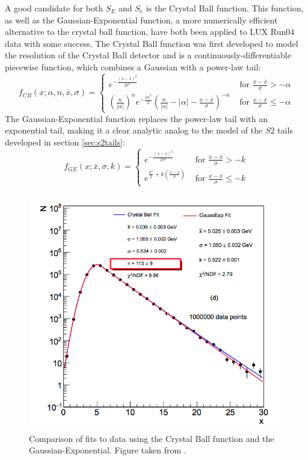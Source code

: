 A good candidate for both $S_E$ and $S_e$ is the Crystal Ball function\cite{crystalball}. This function, as well as the Gaussian-Exponential function, a more numerically efficient alternative to the crystal ball function\cite{alternatecrystalball}, have both been applied to LUX Run04 data with some success. The Crystal Ball function was first developed to model the resolution of the Crystal Ball detector and is a continuously-differentiable piecewise function, which combines a Gaussian with a power-law tail:
\begin{equation}\label{eq:crystalball}
f_{CB}(x;\alpha,n,\bar{x},\sigma) = 
\begin{cases}
 e^{-\frac{(x-\bar{x})^2}{2\sigma^2}} & \mbox{ for } \frac{x-\bar{x}}{\sigma}>-\alpha  \\ 
\left(\frac{n}{|\alpha|}\right)^n e^{-\frac{|\alpha|^2}{2}}\left(\frac{n}{|\alpha|}-|\alpha|-\frac{x-\bar{x}}{\sigma} \right)^{-n} & \mbox{ for } \frac{x-\bar{x}}{\sigma} \leq -\alpha 
 \end{cases}
 \end{equation}
The Gaussian-Exponential function replaces the power-law tail with an exponential tail, making it a clear analytic analog to the model of the $S2$ tails developed in section \ref{sec:s2tails}:
\begin{equation}\label{eq:gausexp}
f_{GE}(x;\bar{x},\sigma,k) = 
\begin{cases}
 e^{-\frac{(x-\bar{x})^2}{2\sigma^2}} & \mbox{ for } \frac{x-\bar{x}}{\sigma}>-k  \\ 
 e^{\frac{k^2}{2}+k(\frac{x-\bar{x}}{\sigma})}& \mbox{ for } \frac{x-\bar{x}}{\sigma} \leq -k
 \end{cases}
 \end{equation}
\begin{figure}[h!]
\centering
\includegraphics[width=\textwidth]{Figures/crystalball.png}
\caption{Comparison of fits to data using the Crystal Ball function and the Gaussian-Exponential. Figure taken from \cite{alternatecrystalball}.}
\label{fig:crystalball}
\end{figure}

